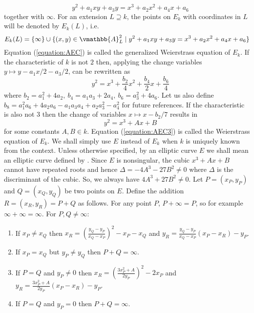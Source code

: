 \begin{equation}
\label{equation:AEC}
\quad y^2 + a_1xy + a_3y = x^3 + a_2x^2 + a_4x + a_6
\end{equation}
together with $\infty$.  For an extension $L \supseteq k$, the points on $E_k$ with coordinates in 
$L$ will be denoted by $E_k(L)$, i.e. 
$$
E_k(L) = \{ \infty \} \cup \{ (x, y) \in \vmathbb{A}_L^2 \mid y^2 + a_1xy + a_3y = x^3 + a_2x^2 + 
a_4x + a_6\}
$$
Equation (\ref{equation:AEC}) is called the generalized Weierstrass equation of $E_k$. If the 
characteristic of $k$ is not $2$ then, applying the change variables $y \mapsto y - a_1x / 2 - a_3 / 
2$,  can be rewritten as
\begin{equation}
\label{equation:AEC2}
\quad y^2 = x^3 + \frac{b_2}{4}x^2 + \frac{b_4}{2}x + \frac{b_6}{4}
\end{equation}
where  $b_2 = a_1^2 + 4a_2,\: b_4 = a_1a_3 + 2a_4,\: b_6 = a_3^2 + 4a_6$. Let us also define $b_8 = 
a_1^2a_6 + 4a_2a_6 - a_1a_3a_4 + a_2a_3^2 - a_4^2$ for future references. If the characteristic is 
also not $3$ then the change of variables $x \mapsto x - b_2 / 7$ results in
\begin{equation}
\label{equation:AEC3}
\quad y^2 = x^3 + Ax + B
\end{equation}
for some constants $A, B \in k$. Equation (\ref{equation:AEC3}) is called the Weierstrass equation 
of $E_k$. We shall simply use $E$ instead of $E_k$ when $k$ is uniquely known from the context. 
Unless otherwise specified, by an elliptic curve $E$ we shall mean an elliptic curve defined by 
. Since $E$ is nonsingular, the cubic $x^3 + Ax + B$ cannot have repeated 
roots and hence $\Delta = -4A^3 - 27B^2 \ne 0$ where $\Delta$ is the discriminant of the cubic. So, 
we always have $4A^3 + 27B^2 \ne 0$. Let $P = (x_P, y_P)$ and $Q = (x_Q, y_Q)$ be two points on $E$. 
Define the addition $R = (x_R, y_R) = P + Q$ as follows. For any point $P$, $P + \infty = P$, so for 
example $\infty + \infty = \infty$. For $P, Q \ne \infty$:
\begin{enumerate}
\item If $x_P \ne x_Q$ then $x_R = \left( \frac{y_Q - y_P}{x_Q - x_P} \right)^2 - x_P - x_Q$ and 
$y_R = \frac{y_Q - y_P}{x_Q - x_P}(x_P - x_R) - y_P$.
\label{item:glaw-dist}
\item If $x_P = x_Q$ but $y_P \ne y_Q$ then $P + Q = \infty$.
\item If $P = Q$ and $y_P \ne 0$ then $x_R = \left( \frac{3x_P^2 + A}{2y_P} \right)^2 - 2x_P$ and 
$y_R = \frac{3x_P^2 + A}{2y_P}(x_P - x_R) - y_P$.
\item If $P = Q$ and $y_P = 0$ then $P + Q = \infty$.
\end{enumerate}
